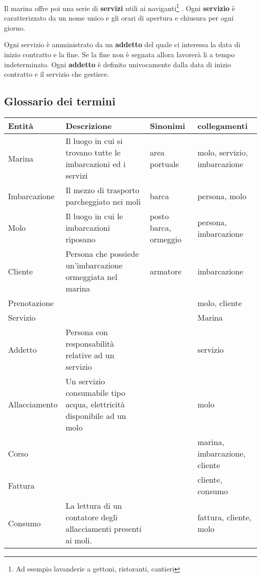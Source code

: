 Il marina offre poi una serie di \textbf{servizi} utili ai naviganti\footnote{Ad esempio lavanderie a gettoni, ristoranti, cantieri} . Ogni \textbf{servizio} è caratterizzato da un nome unico e gli orari di apertura e chiusura per ogni giorno.

Ogni servizio è amministrato da un \textbf{addetto} del quale ci interessa la data di inizio contratto e la fine. Se la fine non è segnata allora lavorerà li a tempo indeterminato. Ogni \textbf{addetto} è definito univocamente dalla data di inizio contratto e il servizio che gestisce.

\subsection{Glossario dei termini}

\begin{center}
    \begin{tabularx}{\textwidth}{|p{2.4cm}|p{8cm}|p{2.4cm}|X|}
        \hline
        \textbf{Entità} & \textbf{Descrizione} & \textbf{Sinonimi} & \textbf{collegamenti} \\
        \hline
        Marina & Il luogo in cui si trovano tutte le imbarcazioni ed i servizi  & area portuale & molo, servizio, imbarcazione\\
        
        \hline
        Imbarcazione & Il mezzo di trasporto parcheggiato nei moli & barca & persona, molo\\
        
        \hline
        Molo & Il luogo in cui le imbarcazioni riposano & posto barca, ormeggio & persona, imbarcazione\\
        
        \hline
        Cliente& Persona che possiede un'imbarcazione ormeggiata nel marina & armatore & imbarcazione\\
        
        \hline
        Prenotazione &&&molo, cliente \\
        
        \hline
        Servizio &&&Marina \\
        
        \hline
        Addetto & Persona con responsabilità relative ad un servizio & & servizio \\
        
        \hline
        Allacciamento & Un servizio consumabile tipo acqua, elettricità disponibile ad un molo& & molo\\
        \hline
        Corso & & &marina, imbarcazione, cliente\\
        \hline
        Fattura &&& cliente, consumo\\
        \hline
        Consumo & La lettura di un contatore degli allacciamenti presenti ai moli.& & fattura, cliente, molo\\
        \hline
    \end{tabularx}
\end{center}

